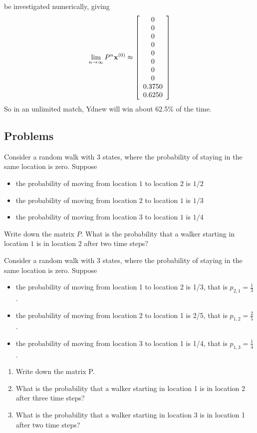 \begin{example}
{be investigated numerically, giving 
\[
\lim_{n \rightarrow \infty} P^n {\bf x}^{(0)} \approx 
\left[ \begin{array}{c} 
0 \\ 0 \\ 0 \\ 0 \\ 0 \\ 0 \\ 0 \\ 0 \\ 0.3750 \\ 0.6250 
\end{array}
\right]
\]
So in an unlimited match, Ydnew will win about 62.5\% of the time. 
}
\end{example}

\subsection{Problems}

\begin{problem}
\label{op3_13}
Consider a random walk with $3$ states, where the probability of
staying in the same location is zero. Suppose
\begin{itemize}
\item the probability of moving from location $1$ to location $2$ is $1/2$
\item the probability of moving from location $2$ to location $1$ is $1/3$
\item the probability of moving from location $3$ to location $1$ is
$1/4$
\end{itemize}
Write down the matrix $P$. What is the probability that a walker
starting in location $1$ is in location $2$ after two time steps?
\end{problem}

\begin{problem}
\label{2009_a8_3}
Consider a random walk with 3 states, where the probability of
staying in the same location is zero. Suppose
\begin{itemize}
\item the probability of moving from location 1 to location 2 is 1/3, that is $p_{2,1}=\frac{1}{3}$.
\item the probability of moving from location 2 to location 1 is 2/5, that is $p_{1,2}=\frac{2}{5}$.
\item the probability of moving from location 3 to location 1 is 1/4, that is $p_{1,3}=\frac{1}{4}$.
\end{itemize}
\begin{enumerate}
\item Write down the matrix P.
\item What is the probability that a walker starting in
location 1 is in location 2 after three time steps?
\item What is the probability that a walker starting in
location 3 is in location 1 after two time steps?
\end{enumerate}
\end{problem}

